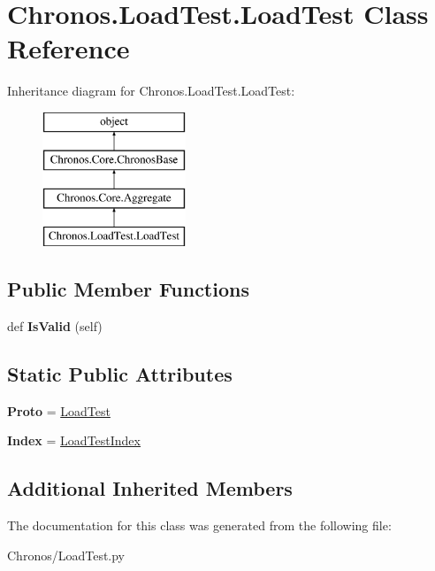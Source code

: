 \hypertarget{classChronos_1_1LoadTest_1_1LoadTest}{}\section{Chronos.\+Load\+Test.\+Load\+Test Class Reference}
\label{classChronos_1_1LoadTest_1_1LoadTest}
Inheritance diagram for Chronos.\+Load\+Test.\+Load\+Test\+:\begin{figure}[H]
\begin{center}
\leavevmode
\includegraphics[height=4.000000cm]{classChronos_1_1LoadTest_1_1LoadTest}
\end{center}
\end{figure}
\subsection*{Public Member Functions}
\begin{DoxyCompactItemize}
\item 
def {\bfseries Is\+Valid} (self)\hypertarget{classChronos_1_1LoadTest_1_1LoadTest_aba91532cd8dacec6d8a4597538f43425}{}\label{classChronos_1_1LoadTest_1_1LoadTest_aba91532cd8dacec6d8a4597538f43425}

\end{DoxyCompactItemize}
\subsection*{Static Public Attributes}
\begin{DoxyCompactItemize}
\item 
{\bfseries Proto} = \hyperlink{classChronos_1_1LoadTest_1_1LoadTest}{Load\+Test}\hypertarget{classChronos_1_1LoadTest_1_1LoadTest_a7e9566463458f79f7f32b0801da9de06}{}\label{classChronos_1_1LoadTest_1_1LoadTest_a7e9566463458f79f7f32b0801da9de06}

\item 
{\bfseries Index} = \hyperlink{classChronos_1_1LoadTest_1_1LoadTestIndex}{Load\+Test\+Index}\hypertarget{classChronos_1_1LoadTest_1_1LoadTest_ab04e6721abf11b434b3c08af00f0d024}{}\label{classChronos_1_1LoadTest_1_1LoadTest_ab04e6721abf11b434b3c08af00f0d024}

\end{DoxyCompactItemize}
\subsection*{Additional Inherited Members}


The documentation for this class was generated from the following file\+:\begin{DoxyCompactItemize}
\item 
Chronos/Load\+Test.\+py\end{DoxyCompactItemize}
